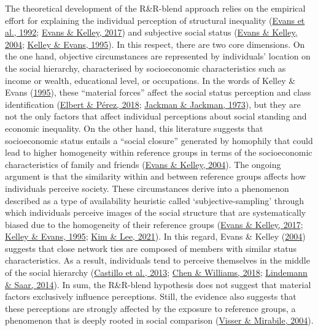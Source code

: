 \documentclass[
  12pt,
]{book}
\begin{document}
The theoretical development of the R\&R-blend approach relies on the empirical effort for explaining the individual perception of structural inequality (\protect\hyperlink{ref-Evans1992}{Evans et al., 1992}; \protect\hyperlink{ref-Evans2017}{Evans \& Kelley, 2017}) and subjective social status (\protect\hyperlink{ref-Evans2004}{Evans \& Kelley, 2004}; \protect\hyperlink{ref-KelleyEvans1995}{Kelley \& Evans, 1995}). In this respect, there are two core dimensions. On the one hand, objective circumstances are represented by individuals' location on the social hierarchy, characterised by socioeconomic characteristics such as income or wealth, educational level, or occupations. In the words of Kelley \& Evans (\protect\hyperlink{ref-KelleyEvans1995}{1995}), these ``material forces'' affect the social status perception and class identification (\protect\hyperlink{ref-Elbert2018}{Elbert \& Pérez, 2018}; \protect\hyperlink{ref-Jackman1973}{Jackman \& Jackman, 1973}), but they are not the only factors that affect individual perceptions about social standing and economic inequality. On the other hand, this literature suggests that socioeconomic status entails a ``social closure'' generated by homophily that could lead to higher homogeneity within reference groups in terms of the socioeconomic characteristics of family and friends (\protect\hyperlink{ref-Evans2004}{Evans \& Kelley, 2004}). The ongoing argument is that the similarity within and between reference groups affects how individuals perceive society. These circumstances derive into a phenomenon described as a type of availability heuristic called `subjective-sampling' through which individuals perceive images of the social structure that are systematically biased due to the homogeneity of their reference groups (\protect\hyperlink{ref-Evans2017}{Evans \& Kelley, 2017}; \protect\hyperlink{ref-KelleyEvans1995}{Kelley \& Evans, 1995}; \protect\hyperlink{ref-kim_social_2021}{Kim \& Lee, 2021}). In this regard, Evans \& Kelley (\protect\hyperlink{ref-Evans2004}{2004}) suggests that close network ties are composed of members with similar status characteristics. As a result, individuals tend to perceive themselves in the middle of the social hierarchy (\protect\hyperlink{ref-Castillo2013}{Castillo et al., 2013}; \protect\hyperlink{ref-ChenWilliams2018}{Chen \& Williams, 2018}; \protect\hyperlink{ref-Lindemann2014}{Lindemann \& Saar, 2014}). In sum, the R\&R-blend hypothesis does not suggest that material factors exclusively influence perceptions. Still, the evidence also suggests that these perceptions are strongly affected by the exposure to reference groups, a phenomenon that is deeply rooted in social comparison (\protect\hyperlink{ref-visser_attitudes_2004}{Visser \& Mirabile, 2004}).
\end{document}
